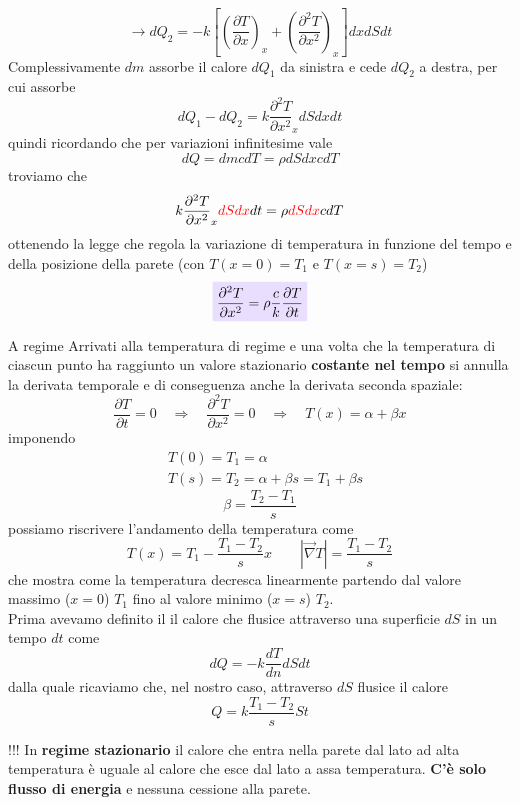 \documentclass[x11names]{report}
\newcommand{\viola}[1]{\colorbox{yred}{$\displaystyle #1$}}
\begin{document}
	\[ 
	\to dQ_2 = -k\left[\left(\frac{\partial T}{\partial x}\right)_x + \left(\frac{\partial^2 T}{\partial x^2}\right)_{x}\right]dxdSdt
	\]
	Complessivamente \(dm\) assorbe il calore \(dQ_1\) da sinistra e cede \(dQ_2\) a destra, per cui assorbe 
	\[ 
	dQ_1 - dQ_2  = k\frac{\partial^2 T}{\partial x^2}_{x}dSdx dt
	\]
	quindi ricordando che per variazioni infinitesime vale
	\[ 
	dQ = dmcdT = \rho dS dx c dT
	\]
	troviamo che 
	\[ 
	k\frac{\partial^2 T}{\partial x^2}_{x}\textcolor{red}{dSdx} dt = \rho  \textcolor{red}{dSdx} c dT
	\]
	ottenendo la legge che regola la variazione di temperatura in funzione del tempo e della posizione della parete (con \(T(x=0) = T_1\) e \(T(x = s) = T_2\))
	\begin{equation}
		\viola{\frac{\partial^2 T}{\partial x^2} = \rho \frac{c}{k} \frac{\partial T}{\partial t}}
	\end{equation}
	\begin{es}{A regime}
		Arrivati alla temperatura di regime e una volta che la temperatura di ciascun punto ha raggiunto un valore stazionario \textbf{costante nel tempo} si annulla la derivata temporale e di conseguenza anche la derivata seconda spaziale:
		\[ 
		\frac{\partial T}{\partial t} = 0 \quad \Rightarrow \quad \frac{\partial^2 T}{\partial x^2} = 0\quad \Rightarrow \quad T(x) = \alpha + \beta x
		\]
		imponendo
		\begin{align*}
			&T(0) = T_1 = \alpha  \\
			&T(s) = T_2 = \alpha + \beta s = T_1 + \beta s
		\end{align*}
		\[ 
		\beta = \frac{T_2 - T_1}{s} 
		\]
		possiamo riscrivere l'andamento della temperatura come
		\[ 
		T(x) = T_1 - \frac{T_1 - T_2}{s}x \qquad |\overrightarrow{\nabla}T |= \frac{T_1 - T_2}{s}
		\]
		che mostra come la temperatura decresca linearmente partendo dal valore massimo (\(x=0\)) \(T_1\) fino al valore minimo (\(x=s\)) \(T_2\). \\
		
		Prima avevamo definito il il calore che flusice attraverso una superficie \(dS\) in un tempo \(dt\) come
		\[ 
		dQ = -k\frac{dT}{dn}dS dt
		\]
		dalla quale ricaviamo che, nel nostro caso, attraverso \(dS\) flusice il calore 
		\[ 
		Q = k\frac{T_1 - T_2}{s}St
		\]
		\begin{center}
			\colorbox{attenzione}{\begin{minipage}{5in}
					\begin{attenzione}{!!!}
						In \textbf{regime stazionario} il calore che entra nella parete dal lato ad alta temperatura è uguale al calore che esce dal lato a assa temperatura. \textbf{C'è solo flusso di energia} e nessuna cessione alla parete.
					\end{attenzione}
			\end{minipage}}
		\end{center}
	\end{es}
	
\end{document}
